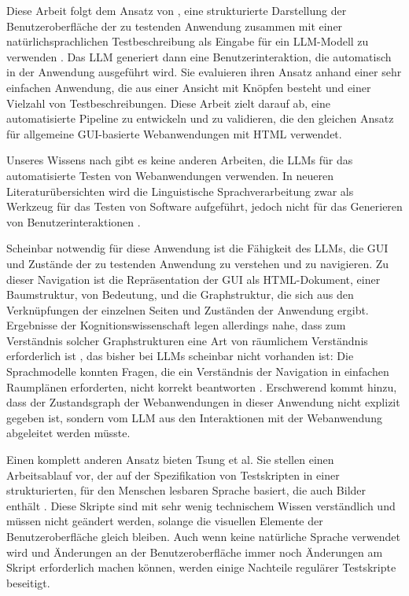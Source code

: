 Diese Arbeit folgt dem Ansatz von , eine strukturierte Darstellung der Benutzeroberfläche der zu testenden Anwendung zusammen mit einer natürlichsprachlichen Testbeschreibung als Eingabe für ein LLM-Modell zu verwenden \cite{GPT3Testing}.
Das LLM generiert dann eine Benutzerinteraktion, die automatisch in der Anwendung ausgeführt wird.
Sie evaluieren ihren Ansatz anhand einer sehr einfachen Anwendung, die aus einer Ansicht mit Knöpfen besteht und einer Vielzahl von Testbeschreibungen.
Diese Arbeit zielt darauf ab, eine automatisierte Pipeline zu entwickeln und zu validieren, die den gleichen Ansatz für allgemeine GUI-basierte Webanwendungen mit HTML verwendet.

Unseres Wissens nach gibt es keine anderen Arbeiten, die LLMs für das automatisierte Testen von Webanwendungen verwenden.
In neueren Literaturübersichten wird die Linguistische Sprachverarbeitung zwar als Werkzeug für das Testen von Software aufgeführt, jedoch nicht für das Generieren von Benutzerinteraktionen \cite{implementation_verma_2023, machine_fontes_2021}.

Scheinbar notwendig für diese Anwendung ist die Fähigkeit des LLMs, die GUI und Zustände der zu testenden Anwendung zu verstehen und zu navigieren.
Zu dieser Navigation ist die Repräsentation der GUI als HTML-Dokument, einer Baumstruktur, von Bedeutung, und die Graphstruktur, die sich aus den Verknüpfungen der einzelnen Seiten und Zuständen der Anwendung ergibt.
Ergebnisse der Kognitionswissenschaft legen allerdings nahe, dass zum Verständnis solcher Graphstrukturen eine Art von räumlichem Verständnis erforderlich ist \cite{what_is_a_cognitive_map}, das bisher bei LLMs scheinbar nicht vorhanden ist:
Die Sprachmodelle konnten Fragen, die ein Verständnis der Navigation in einfachen Raumplänen erforderten, nicht korrekt beantworten \cite{cogmaps_llm}.
Erschwerend kommt hinzu, dass der Zustandsgraph der Webanwendungen in dieser Anwendung nicht explizit gegeben ist, sondern vom LLM aus den Interaktionen mit der Webanwendung abgeleitet werden müsste.

Einen komplett anderen Ansatz bieten Tsung et al.
Sie stellen einen Arbeitsablauf vor, der auf der Spezifikation von Testskripten in einer strukturierten, für den Menschen lesbaren Sprache basiert, die auch Bilder enthält \cite{tsung}.
Diese Skripte sind mit sehr wenig technischem Wissen verständlich und müssen nicht geändert werden, solange die visuellen Elemente der Benutzeroberfläche gleich bleiben.
Auch wenn keine natürliche Sprache verwendet wird und Änderungen an der Benutzeroberfläche immer noch Änderungen am Skript erforderlich machen können, werden einige Nachteile regulärer Testskripte beseitigt.


